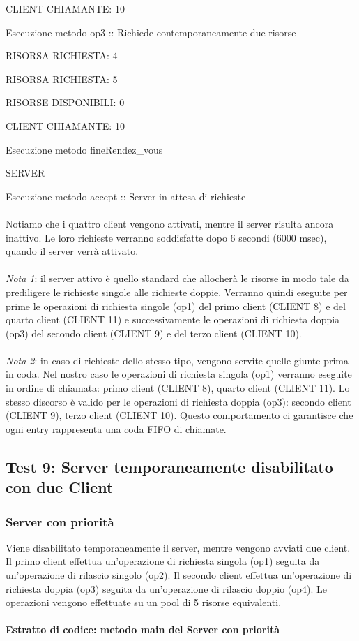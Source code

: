 \documentclass[10pt, a4paper]{article}
\begin{document}
CLIENT CHIAMANTE: 10

Esecuzione metodo op3 :: Richiede contemporaneamente due risorse

RISORSA RICHIESTA: 4

RISORSA RICHIESTA: 5

RISORSE DISPONIBILI: 0

CLIENT CHIAMANTE: 10

Esecuzione metodo fineRendez\_vous

SERVER

Esecuzione metodo accept :: Server in attesa di richieste
\\\\
Notiamo che i quattro client vengono attivati, mentre il server risulta ancora inattivo. Le loro richieste verranno soddisfatte dopo 6 secondi (6000 msec), quando il server verrà attivato.
\\\\
\textit{Nota 1}: il server attivo è quello standard che allocherà le risorse in modo tale da prediligere le richieste singole alle richieste doppie. Verranno quindi eseguite per prime le operazioni di richiesta singole (op1) del primo client (CLIENT 8) e del quarto client (CLIENT 11) e successivamente le operazioni di richiesta doppia (op3) del secondo client (CLIENT 9) e del terzo client (CLIENT 10).
\\\\
\textit{Nota 2}: in caso di richieste dello stesso tipo, vengono servite quelle giunte prima in coda. Nel nostro caso le operazioni di richiesta singola (op1) verranno eseguite in ordine di chiamata: primo client (CLIENT 8), quarto client (CLIENT 11). Lo stesso discorso è valido per le operazioni di richiesta doppia (op3): secondo client (CLIENT 9), terzo client (CLIENT 10). Questo comportamento ci garantisce che ogni entry rappresenta una coda FIFO di chiamate.
\subsection{Test 9: Server temporaneamente disabilitato con due Client}
\subsubsection{Server con priorità}
Viene disabilitato temporaneamente il server, mentre vengono avviati due client. Il primo client effettua un'operazione di richiesta singola (op1) seguita da un'operazione di rilascio singolo (op2). Il secondo client effettua un'operazione di richiesta doppia (op3) seguita da un'operazione di rilascio doppio (op4). Le operazioni vengono effettuate su un pool di 5 risorse equivalenti.
\\\\
\textbf{Estratto di codice: metodo main del Server con priorità}
\\
\end{document}

